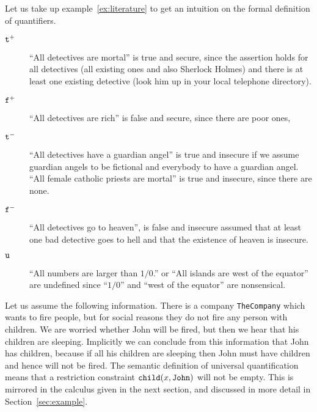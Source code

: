 \documentclass{\filespath jancl}
\newcommand\COMP{{\sf TheCompany}}
\newcommand{\undefined}{{\sf u}}
\newcommand{\twts}{{{\sf t}^+}}
\newcommand{\twfs}{{{\sf f}^+}}
\newcommand{\twti}{{{\sf t}^-}}
\newcommand{\twfi}{{{\sf f}^-}}
\def\sf{\tt}
\begin{document}
\begin{example}\label{ex:literature-quantifiers}
  Let us take up example~\ref{ex:literature} to get an intuition on the formal
  definition of quantifiers.
  \begin{description}
  \item[\phantom{--} $\twts$] ``All detectives are mortal'' is true and secure, since the
    assertion holds for all detectives (all existing ones and also Sherlock
    Holmes) and there is at least one existing detective (look him up in your
    local telephone directory).
  \item[\phantom{--} $\twfs$] ``All detectives are rich'' is false and secure, since there
    are poor ones, 
  \item[\phantom{--} $\twti$] ``All detectives have a guardian angel'' is
    true and insecure if we assume guardian angels to be fictional and
    everybody to have a guardian angel. ``All female catholic
    priests are mortal'' is true and insecure, since there are none.
  \item[\phantom{--} $\twfi$] ``All detectives go to heaven'', is
    false and insecure assumed that at least one bad detective goes to
    hell and that the existence of heaven is insecure.
  \item[\phantom{--} $\undefined$] ``All numbers are larger than $1/0$.'' or ``All
    islands are west of the equator'' are undefined since ``$1/0$'' and ``west of the
    equator'' are nonsensical.
  \end{description}
\end{example}

\begin{example}\label{ex-John}
  Let us assume the following information. There is a company {\COMP}
  which wants to fire people, but for social reasons they do not
  fire any person with children. We are worried whether John will be
  fired, but then we hear that his children are sleeping. Implicitly
  we can conclude from this information that John has children,
  because if all his children are sleeping then John must have
  children and hence will not be fired. The semantic definition of
  universal quantification means that a restriction constraint ${\sf
    child}(x,{\sf John})$ will not be empty. This is mirrored in the
  calculus given in the next section, and discussed in more detail in
  Section~\ref{sec:example}.
\end{example}
\end{document}
